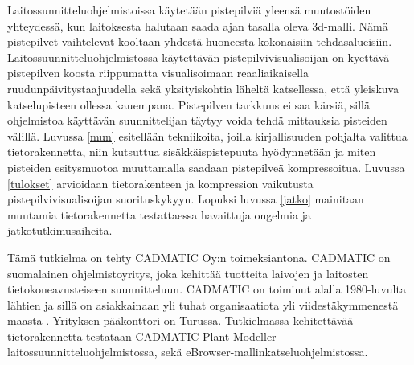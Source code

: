 Laitossunnitteluohjelmistoissa käytetään pistepilviä yleensä muutostöiden yhteydessä, kun laitoksesta halutaan saada ajan tasalla oleva 3d-malli. Nämä pistepilvet vaihtelevat kooltaan yhdestä huoneesta kokonaisiin tehdasalueisiin. Laitossuunnitteluohjelmistossa käytettävän pistepilvivisualisoijan on kyettävä pistepilven koosta riippumatta visualisoimaan reaaliaikaisella ruudunpäivitystaajuudella sekä yksityiskohtia läheltä katsellessa, että yleiskuva katselupisteen ollessa kauempana. Pistepilven tarkkuus ei saa kärsiä, sillä ohjelmistoa käyttävän suunnittelijan täytyy voida tehdä mittauksia pisteiden välillä. Luvussa \ref{mun} esitellään tekniikoita, joilla kirjallisuuden pohjalta valittua tietorakennetta, niin kutsuttua sisäkkäispistepuuta hyödynnetään ja miten pisteiden esitysmuotoa muuttamalla saadaan pistepilveä kompressoitua. Luvussa \ref{tulokset} arvioidaan tietorakenteen ja kompression vaikutusta pistepilvivisualisoijan suorituskykyyn. Lopuksi luvussa \ref{jatko} mainitaan muutamia tietorakennetta testattaessa havaittuja ongelmia ja jatkotutkimusaiheita.

Tämä tutkielma on tehty CADMATIC Oy:n toimeksiantona. CADMATIC on suomalainen ohjelmistoyritys, joka kehittää tuotteita laivojen ja laitosten tietokoneavusteiseen suunnitteluun. CADMATIC on toiminut alalla 1980-luvulta lähtien ja sillä on asiakkainaan yli tuhat organisaatiota yli viidestäkymmenestä maasta \cite{cadmatic}. Yrityksen pääkonttori on Turussa. Tutkielmassa kehitettävää tietorakennetta testataan CADMATIC Plant Modeller -laitossuunnitteluohjelmistossa, sekä eBrowser-mallinkatseluohjelmistossa. 